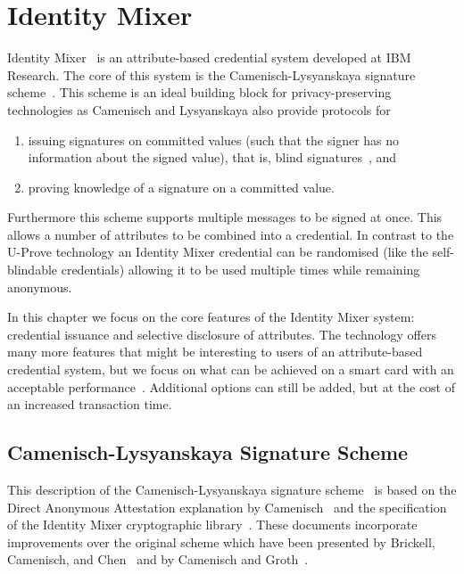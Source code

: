 \chapter{Identity Mixer}

Identity Mixer~\cite{IdemixCrypto2012,CamenischH02} is an attribute-based
credential system developed at IBM Research. The core of this system is the
Camenisch-Lysyanskaya signature scheme~\cite{CamenischLysyanskaya2002,Lysyanskaya2002}.
This scheme is an ideal building block for privacy-preserving technologies as
Camenisch and Lysyanskaya also provide protocols for
\begin{enumerate}
  \item issuing signatures on committed values (such that the signer has no
    information about the signed value), that is, blind
    signatures~\cite{Chaum1983}, and
  \item proving knowledge of a signature on a committed value.
\end{enumerate}
Furthermore this scheme supports multiple messages to be signed at once. This
allows a number of attributes to be combined into a credential. In contrast to
the U-Prove technology an Identity Mixer credential can be randomised (like the
self-blindable credentials) allowing it to be used multiple times while
remaining anonymous.

In this chapter we focus on the core features of the Identity Mixer system:
credential issuance and selective disclosure of attributes. The technology
offers many more features that might be interesting to users of an
attribute-based credential system, but we focus on what can be achieved on a
smart card with an acceptable performance~\cite{VullersAlpar2013}. Additional
options can still be added, but at the cost of an increased transaction time.

\section{Camenisch-Lysyanskaya Signature Scheme}

This description of the Camenisch-Lysyanskaya signature
scheme~\cite{CamenischLysyanskaya2002,Lysyanskaya2002} is based on the Direct
Anonymous Attestation explanation by Camenisch~\cite{Camenisch2007} and the
specification of the Identity Mixer cryptographic
library~\cite{IdemixCrypto2012}. These documents incorporate improvements over
the original scheme which have been presented by Brickell, Camenisch, and
Chen~\cite{BrickellCC2004} and by Camenisch and Groth~\cite{CamenischGroth2004}.

